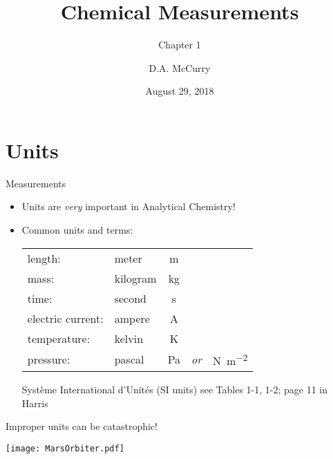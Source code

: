 \documentclass[notes=hide]{beamer}
\title{Chemical Measurements}
\subtitle{Chapter 1}
\author{D.A. McCurry}
\institute{Department of Chemistry and Biochemistry \\ Bloomsburg University}
\date{August 29, 2018}
\begin{document}
\maketitle
{}



\section{Units}

\begin{frame}{Measurements}
	\begin{itemize}
		\item Units are \emph{very} important in Analytical Chemistry!

		\item Common units and terms:

	\begin{center}
	\begin{tabular} {l l c c c}
		length: & meter & \si{\meter} \\
		mass: & kilogram & \si{\kilo\gram} \\
		time: & second & \si{\second} \\
		electric current: & ampere & \si{\ampere} \\
		temperature: & kelvin & \si{\kelvin} \\
		pressure: & pascal & \si{\pascal} & \emph{or} &
			\si{\newton\per\meter\squared} \\
	\end{tabular}
	\end{center}

	\begin{block}{Syst\`{e}me International d'Unit\'{e}s (SI units)}
		see Tables 1-1, 1-2; page 11 in Harris
	\end{block}
	\end{itemize}
\end{frame}

\begin{frame}[allowframebreaks]{Improper units can be catastrophic!}


	\framebreak

	\texttt{[image: MarsOrbiter.pdf]}
\end{frame}
\end{document}
